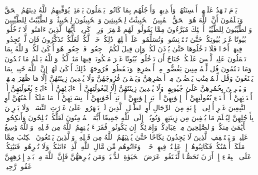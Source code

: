یَوۡمَ تَشۡهَدُ عَلَیۡهِمۡ أَلۡسِنَتُهُمۡ وَأَیۡدِیهِمۡ وَأَرۡجُلُهُم بِمَا كَانُوا۟ یَعۡمَلُونَ%
\stopbuffer
\startbuffer[\q:24:25]
یَوۡمَئِذࣲ یُوَفِّیهِمُ ٱللَّهُ دِینَهُمُ ٱلۡحَقَّ وَیَعۡلَمُونَ أَنَّ ٱللَّهَ هُوَ ٱلۡحَقُّ ٱلۡمُبِینُ%
\stopbuffer
\startbuffer[\q:24:26]
ٱلۡخَبِیثَٰتُ لِلۡخَبِیثِینَ وَٱلۡخَبِیثُونَ لِلۡخَبِیثَٰتِۖ وَٱلطَّیِّبَٰتُ لِلطَّیِّبِینَ وَٱلطَّیِّبُونَ لِلطَّیِّبَٰتِۚ أُو۟لَٰۤئِكَ مُبَرَّءُونَ مِمَّا یَقُولُونَۖ لَهُم مَّغۡفِرَةࣱ وَرِزۡقࣱ كَرِیمࣱ%
\stopbuffer
\startbuffer[\q:24:27]
یَٰۤأَیُّهَا ٱلَّذِینَ ءَامَنُوا۟ لَا تَدۡخُلُوا۟ بُیُوتًا غَیۡرَ بُیُوتِكُمۡ حَتَّىٰ تَسۡتَأۡنِسُوا۟ وَتُسَلِّمُوا۟ عَلَىٰۤ أَهۡلِهَاۚ ذَٰلِكُمۡ خَیۡرࣱ لَّكُمۡ لَعَلَّكُمۡ تَذَكَّرُونَ%
\stopbuffer
\startbuffer[\q:24:28]
فَإِن لَّمۡ تَجِدُوا۟ فِیهَاۤ أَحَدࣰا فَلَا تَدۡخُلُوهَا حَتَّىٰ یُؤۡذَنَ لَكُمۡۖ وَإِن قِیلَ لَكُمُ ٱرۡجِعُوا۟ فَٱرۡجِعُوا۟ۖ هُوَ أَزۡكَىٰ لَكُمۡۚ وَٱللَّهُ بِمَا تَعۡمَلُونَ عَلِیمࣱ%
\stopbuffer
\startbuffer[\q:24:29]
لَّیۡسَ عَلَیۡكُمۡ جُنَاحٌ أَن تَدۡخُلُوا۟ بُیُوتًا غَیۡرَ مَسۡكُونَةࣲ فِیهَا مَتَٰعࣱ لَّكُمۡۚ وَٱللَّهُ یَعۡلَمُ مَا تُبۡدُونَ وَمَا تَكۡتُمُونَ%
\stopbuffer
\startbuffer[\q:24:30]
قُل لِّلۡمُؤۡمِنِینَ یَغُضُّوا۟ مِنۡ أَبۡصَٰرِهِمۡ وَیَحۡفَظُوا۟ فُرُوجَهُمۡۚ ذَٰلِكَ أَزۡكَىٰ لَهُمۡۚ إِنَّ ٱللَّهَ خَبِیرُۢ بِمَا یَصۡنَعُونَ%
\stopbuffer
\startbuffer[\q:24:31]
وَقُل لِّلۡمُؤۡمِنَٰتِ یَغۡضُضۡنَ مِنۡ أَبۡصَٰرِهِنَّ وَیَحۡفَظۡنَ فُرُوجَهُنَّ وَلَا یُبۡدِینَ زِینَتَهُنَّ إِلَّا مَا ظَهَرَ مِنۡهَاۖ وَلۡیَضۡرِبۡنَ بِخُمُرِهِنَّ عَلَىٰ جُیُوبِهِنَّۖ وَلَا یُبۡدِینَ زِینَتَهُنَّ إِلَّا لِبُعُولَتِهِنَّ أَوۡ ءَابَاۤئِهِنَّ أَوۡ ءَابَاۤءِ بُعُولَتِهِنَّ أَوۡ أَبۡنَاۤئِهِنَّ أَوۡ أَبۡنَاۤءِ بُعُولَتِهِنَّ أَوۡ إِخۡوَٰنِهِنَّ أَوۡ بَنِیۤ إِخۡوَٰنِهِنَّ أَوۡ بَنِیۤ أَخَوَٰتِهِنَّ أَوۡ نِسَاۤئِهِنَّ أَوۡ مَا مَلَكَتۡ أَیۡمَٰنُهُنَّ أَوِ ٱلتَّٰبِعِینَ غَیۡرِ أُو۟لِی ٱلۡإِرۡبَةِ مِنَ ٱلرِّجَالِ أَوِ ٱلطِّفۡلِ ٱلَّذِینَ لَمۡ یَظۡهَرُوا۟ عَلَىٰ عَوۡرَٰتِ ٱلنِّسَاۤءِۖ وَلَا یَضۡرِبۡنَ بِأَرۡجُلِهِنَّ لِیُعۡلَمَ مَا یُخۡفِینَ مِن زِینَتِهِنَّۚ وَتُوبُوۤا۟ إِلَى ٱللَّهِ جَمِیعًا أَیُّهَ ٱلۡمُؤۡمِنُونَ لَعَلَّكُمۡ تُفۡلِحُونَ%
\stopbuffer
\startbuffer[\q:24:32]
وَأَنكِحُوا۟ ٱلۡأَیَٰمَىٰ مِنكُمۡ وَٱلصَّٰلِحِینَ مِنۡ عِبَادِكُمۡ وَإِمَاۤئِكُمۡۚ إِن یَكُونُوا۟ فُقَرَاۤءَ یُغۡنِهِمُ ٱللَّهُ مِن فَضۡلِهِۦۗ وَٱللَّهُ وَٰسِعٌ عَلِیمࣱ%
\stopbuffer
\startbuffer[\q:24:33]
وَلۡیَسۡتَعۡفِفِ ٱلَّذِینَ لَا یَجِدُونَ نِكَاحًا حَتَّىٰ یُغۡنِیَهُمُ ٱللَّهُ مِن فَضۡلِهِۦۗ وَٱلَّذِینَ یَبۡتَغُونَ ٱلۡكِتَٰبَ مِمَّا مَلَكَتۡ أَیۡمَٰنُكُمۡ فَكَاتِبُوهُمۡ إِنۡ عَلِمۡتُمۡ فِیهِمۡ خَیۡرࣰاۖ وَءَاتُوهُم مِّن مَّالِ ٱللَّهِ ٱلَّذِیۤ ءَاتَىٰكُمۡۚ وَلَا تُكۡرِهُوا۟ فَتَیَٰتِكُمۡ عَلَى ٱلۡبِغَاۤءِ إِنۡ أَرَدۡنَ تَحَصُّنࣰا لِّتَبۡتَغُوا۟ عَرَضَ ٱلۡحَیَوٰةِ ٱلدُّنۡیَاۚ وَمَن یُكۡرِههُّنَّ فَإِنَّ ٱللَّهَ مِنۢ بَعۡدِ إِكۡرَٰهِهِنَّ غَفُورࣱ رَّحِیمࣱ%
